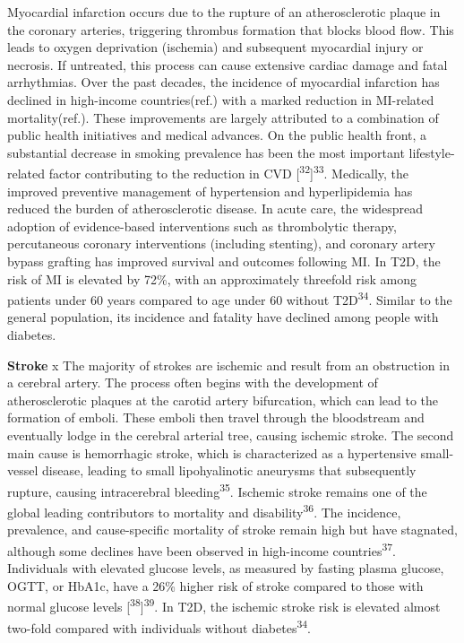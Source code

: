 \documentclass[
  a4paper,
  headsepline=true,
  open=any]{scrbook}
\begin{document}
Myocardial infarction occurs due to the rupture of an atherosclerotic
plaque in the coronary arteries, triggering thrombus formation that
blocks blood flow. This leads to oxygen deprivation (ischemia) and
subsequent myocardial injury or necrosis. If untreated, this process can
cause extensive cardiac damage and fatal arrhythmias. Over the past
decades, the incidence of myocardial infarction has declined in
high-income countries(ref.) with a marked reduction in MI-related
mortality(ref.). These improvements are largely attributed to a
combination of public health initiatives and medical advances. On the
public health front, a substantial decrease in smoking prevalence has
been the most important lifestyle-related factor contributing to the
reduction in CVD {[}\textsuperscript{32}{]}\textsuperscript{33}.
Medically, the improved preventive management of hypertension and
hyperlipidemia has reduced the burden of atherosclerotic disease. In
acute care, the widespread adoption of evidence-based interventions such
as thrombolytic therapy, percutaneous coronary interventions (including
stenting), and coronary artery bypass grafting has improved survival and
outcomes following MI. In T2D, the risk of MI is elevated by 72\%, with
an approximately threefold risk among patients under 60 years compared
to age under 60 without T2D\textsuperscript{34}. Similar to the general
population, its incidence and fatality have declined among people with
diabetes.

\textbf{Stroke} x The majority of strokes are ischemic and result from
an obstruction in a cerebral artery. The process often begins with the
development of atherosclerotic plaques at the carotid artery
bifurcation, which can lead to the formation of emboli. These emboli
then travel through the bloodstream and eventually lodge in the cerebral
arterial tree, causing ischemic stroke. The second main cause is
hemorrhagic stroke, which is characterized as a hypertensive
small-vessel disease, leading to small lipohyalinotic aneurysms that
subsequently rupture, causing intracerebral
bleeding\textsuperscript{35}. Ischemic stroke remains one of the global
leading contributors to mortality and disability\textsuperscript{36}.
The incidence, prevalence, and cause-specific mortality of stroke remain
high but have stagnated, although some declines have been observed in
high-income countries\textsuperscript{37}. Individuals with elevated
glucose levels, as measured by fasting plasma glucose, OGTT, or HbA1c,
have a 26\% higher risk of stroke compared to those with normal glucose
levels {[}\textsuperscript{38}{]}\textsuperscript{39}. In T2D, the
ischemic stroke risk is elevated almost two-fold compared with
individuals without diabetes\textsuperscript{34}.
\end{document}
